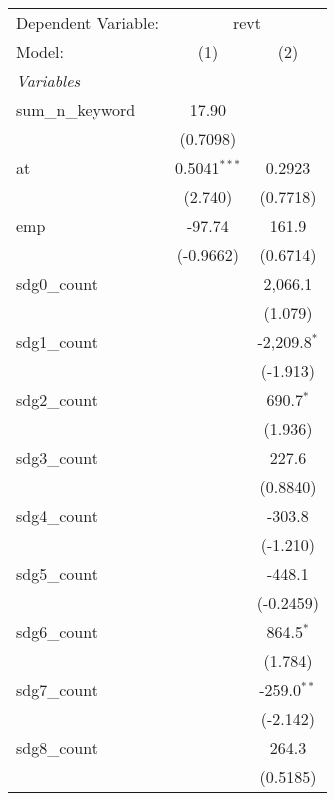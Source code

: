 
\begingroup
\centering
\begin{tabular}{lcc}
   \tabularnewline \midrule \midrule
   Dependent Variable: & \multicolumn{2}{c}{revt}\\
   Model:            & (1)            & (2)\\  
   \midrule
   \emph{Variables}\\
   sum\_n\_keyword   & 17.90          &   \\   
                     & (0.7098)       &   \\   
   at                & 0.5041$^{***}$ & 0.2923\\   
                     & (2.740)        & (0.7718)\\   
   emp               & -97.74         & 161.9\\   
                     & (-0.9662)      & (0.6714)\\   
   sdg0\_count       &                & 2,066.1\\   
                     &                & (1.079)\\   
   sdg1\_count       &                & -2,209.8$^{*}$\\   
                     &                & (-1.913)\\   
   sdg2\_count       &                & 690.7$^{*}$\\   
                     &                & (1.936)\\   
   sdg3\_count       &                & 227.6\\   
                     &                & (0.8840)\\   
   sdg4\_count       &                & -303.8\\   
                     &                & (-1.210)\\   
   sdg5\_count       &                & -448.1\\   
                     &                & (-0.2459)\\   
   sdg6\_count       &                & 864.5$^{*}$\\   
                     &                & (1.784)\\   
   sdg7\_count       &                & -259.0$^{**}$\\   
                     &                & (-2.142)\\   
   sdg8\_count       &                & 264.3\\   
                     &                & (0.5185)\\   

\end{tabular}
